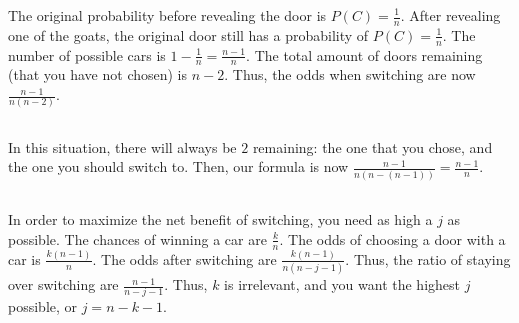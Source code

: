 \documentclass{article}
\begin{document}
The original probability before revealing the door is \(P(C) = \frac{1}{n}\).
After revealing one of the goats, the original door still has a probability of \(P(C) = \frac{1}{n}\).
The number of possible cars is \(1 - \frac{1}{n} = \frac{n - 1}{n}\).
The total amount of doors remaining (that you have not chosen) is \(n - 2\).
Thus, the odds when switching are now \(\frac{n - 1}{n (n - 2)}\).

\subsection{}

In this situation, there will always be \(2\) remaining: the one that you chose, and the one you should switch to.
Then, our formula is now \(\frac{n - 1}{n (n - (n - 1))} = \frac{n - 1}{n}\).

\subsection{}

In order to maximize the net benefit of switching, you need as high a \(j\) as possible.
The chances of winning a car are \(\frac{k}{n}\).
The odds of choosing a door with a car is \(\frac{k (n - 1)}{n}\).
The odds after switching are \(\frac{k (n - 1)}{n (n - j - 1)}\).
Thus, the ratio of staying over switching are \(\frac{n - 1}{n - j - 1}\).
Thus, \(k\) is irrelevant, and you want the highest \(j\) possible, or \(j = n - k - 1\).
\end{document}
